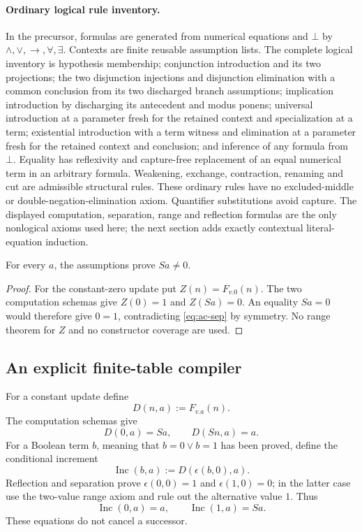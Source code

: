 \paragraph{Ordinary logical rule inventory.}
In the precursor, formulas are generated from numerical equations and
$\bot$ by $\land,\lor,\to,\forall,\exists$. Contexts are finite reusable
assumption lists. The complete logical inventory is hypothesis membership;
conjunction introduction and its two projections; the two disjunction
injections and disjunction elimination with a common conclusion from its
two discharged branch assumptions; implication introduction by discharging
its antecedent and modus ponens; universal introduction at a parameter
fresh for the retained context and specialization at a term; existential
introduction with a term witness and elimination at a parameter fresh for
the retained context and conclusion; and inference of any formula from
$\bot$. Equality has reflexivity and capture-free replacement of an equal
numerical term in an arbitrary formula. Weakening, exchange, contraction,
renaming and cut are admissible structural rules. These ordinary rules
have no excluded-middle or double-negation-elimination axiom. Quantifier
substitutions avoid capture. The displayed computation, separation,
range and reflection formulas are the only nonlogical axioms used here;
the next section adds exactly contextual literal-equation induction.

\begin{lemma}
\label{lem:ac-zero}
For every $a$, the assumptions prove $Sa\ne0$.
\end{lemma}
\begin{proof}
For the constant-zero update put $Z(n)=F_{v.0}(n)$. The two computation
schemas give $Z(0)=1$ and $Z(Sa)=0$. An equality $Sa=0$ would therefore
give $0=1$, contradicting \eqref{eq:ac-sep} by symmetry. No range theorem
for $Z$ and no constructor coverage are used.
\end{proof}

\subsection{An explicit finite-table compiler}

For a constant update define
\[
 D(n,a):=F_{v.a}(n).
\]
The computation schemas give
\[
 D(0,a)=Sa,\qquad D(Sn,a)=a.
\]
For a Boolean term $b$, meaning that $b=0\lor b=1$ has been proved,
define the conditional increment
\[
 \operatorname{Inc}(b,a):=D(\epsilon(b,0),a).
\]
Reflection and separation prove $\epsilon(0,0)=1$ and
$\epsilon(1,0)=0$; in the latter case use the two-value range axiom and
rule out the alternative value $1$. Thus
\begin{equation}
 \operatorname{Inc}(0,a)=a,\qquad
 \operatorname{Inc}(1,a)=Sa.
 \label{eq:ac-inc}
\end{equation}
These equations do not cancel a successor.


